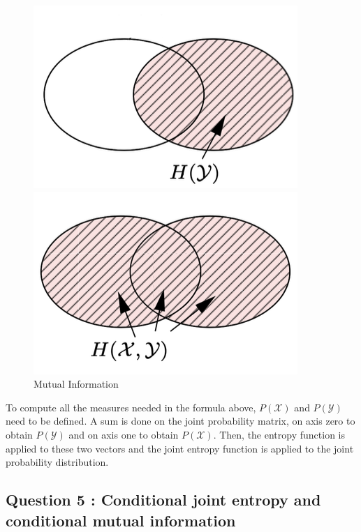 \documentclass[titlepage]{article}
\begin{document}
\begin{figure}[h!]
    \begin{minipage}{.5\textwidth}
        \centering
        \includegraphics[scale = 0.7]{entropyy.png}
    \end{minipage}
    \hspace{0.2cm}
    \begin{minipage}{.5\textwidth}
        \centering
        \includegraphics[scale = 0.7]{jointentropy.png}
    \end{minipage}
    \caption{Mutual Information}
    \label{fig:mutualinfo}
\end{figure}

To compute all the measures needed in the formula above, $P(\mathcal{X})$ and $P(\mathcal{Y})$ need to be defined. A sum is done on the joint probability matrix, on axis zero to obtain  $P(\mathcal{Y})$ and on axis one to obtain $P(\mathcal{X})$. Then, the entropy function is applied to these two vectors and the joint entropy function is applied to the joint probability distribution. 

\subsection*{Question 5 : Conditional joint entropy and conditional mutual information}
\end{document}
